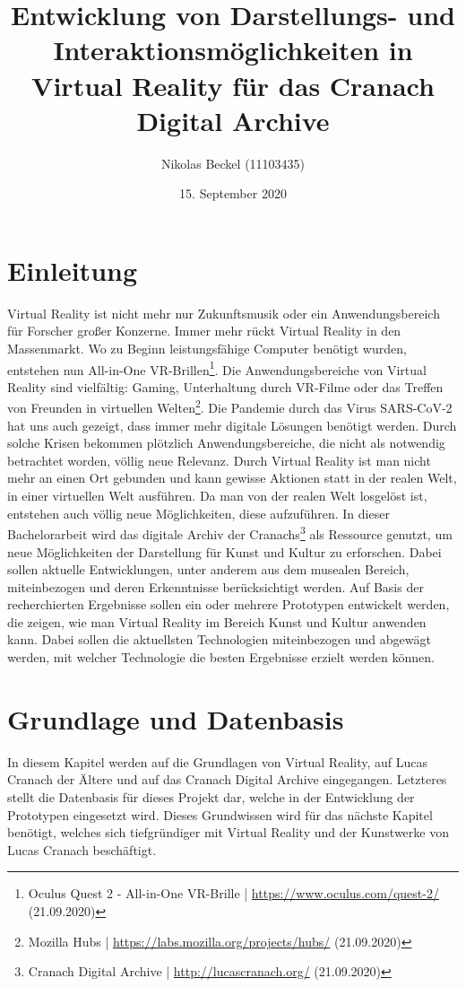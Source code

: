 \documentclass[a4paper,12pt,oneside]{article}
\title{Entwicklung von Darstellungs- und Interaktionsmöglichkeiten in Virtual Reality für das Cranach Digital Archive}
\author{Nikolas Beckel (11103435)}
\date{15. September 2020}
\begin{document}
  \tableofcontents
  \newpage
  \section{Einleitung}
      
    Virtual Reality ist nicht mehr nur Zukunftsmusik oder ein Anwendungsbereich für Forscher
    großer Konzerne. Immer mehr rückt Virtual Reality in den Massenmarkt. Wo zu Beginn
    leistungsfähige Computer benötigt wurden, entstehen nun All-in-One VR-Brillen\footnote{Oculus Quest 2 - All-in-One VR-Brille | \url{https://www.oculus.com/quest-2/} (21.09.2020)}.
    Die Anwendungsbereiche von Virtual Reality sind vielfältig: Gaming, Unterhaltung durch VR-Filme oder
    das Treffen von Freunden in virtuellen Welten\footnote{Mozilla Hubs | \url{https://labs.mozilla.org/projects/hubs/} (21.09.2020)}.
    Die Pandemie durch das Virus SARS-CoV-2 hat uns auch gezeigt, dass immer mehr digitale Lösungen
    benötigt werden. Durch solche Krisen bekommen plötzlich Anwendungsbereiche, die nicht als
    notwendig betrachtet worden, völlig neue Relevanz.
    Durch Virtual Reality ist man nicht mehr an einen Ort gebunden und kann gewisse Aktionen
    statt in der realen Welt, in einer virtuellen Welt ausführen. Da man von der realen Welt
    losgelöst ist, entstehen auch völlig neue Möglichkeiten, diese aufzuführen.
    In dieser Bachelorarbeit wird das digitale Archiv der Cranachs\footnote{Cranach Digital Archive | \url{http://lucascranach.org/} (21.09.2020)}
    als Ressource genutzt, um neue Möglichkeiten der Darstellung für Kunst und Kultur zu erforschen.
    Dabei sollen aktuelle Entwicklungen, unter anderem aus dem musealen Bereich, miteinbezogen 
    und deren Erkenntnisse berücksichtigt werden.
    Auf Basis der recherchierten Ergebnisse sollen ein oder mehrere Prototypen entwickelt werden,
    die zeigen, wie man Virtual Reality im Bereich Kunst und Kultur anwenden kann. Dabei sollen die
    aktuellsten Technologien miteinbezogen und abgewägt werden, mit welcher Technologie die
    besten Ergebnisse erzielt werden können.

  \section{Grundlage und Datenbasis}
    In diesem Kapitel werden auf die Grundlagen von Virtual Reality, auf Lucas Cranach 
    der Ältere und auf das Cranach Digital Archive eingegangen. Letzteres stellt 
    die Datenbasis für dieses Projekt dar, welche in der Entwicklung der Prototypen 
    eingesetzt wird. Dieses Grundwissen wird für das nächste Kapitel benötigt, welches 
    sich tiefgründiger mit Virtual Reality und der Kunstwerke von Lucas Cranach
    beschäftigt.
\end{document}
